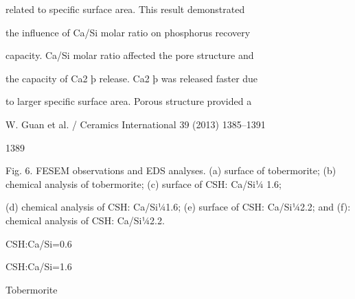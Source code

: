 \documentclass[a4paper,portrait,12pt]{article}
\begin{document}
\begin{flushleft}
related to speciﬁc surface area. This result demonstrated
\end{flushleft}


\begin{flushleft}
the inﬂuence of Ca/Si molar ratio on phosphorus recovery
\end{flushleft}


\begin{flushleft}
capacity. Ca/Si molar ratio affected the pore structure and
\end{flushleft}


\begin{flushleft}
the capacity of Ca2 þ release. Ca2 þ was released faster due
\end{flushleft}


\begin{flushleft}
to larger speciﬁc surface area. Porous structure provided a
\end{flushleft}





\begin{flushleft}
\newpage
W. Guan et al. / Ceramics International 39 (2013) 1385--1391
\end{flushleft}





1389





\begin{flushleft}
Fig. 6. FESEM observations and EDS analyses. (a) surface of tobermorite; (b) chemical analysis of tobermorite; (c) surface of CSH: Ca/Si¼ 1.6;
\end{flushleft}


\begin{flushleft}
(d) chemical analysis of CSH: Ca/Si¼1.6; (e) surface of CSH: Ca/Si¼2.2; and (f): chemical analysis of CSH: Ca/Si¼2.2.
\end{flushleft}





\begin{flushleft}
CSH:Ca/Si=0.6
\end{flushleft}


\begin{flushleft}
CSH:Ca/Si=1.6
\end{flushleft}


\begin{flushleft}
Tobermorite
\end{flushleft}
\end{document}
